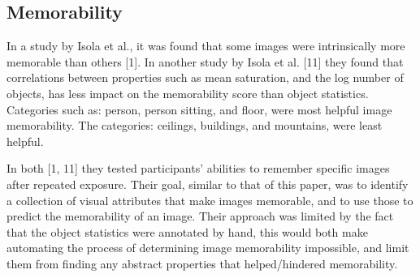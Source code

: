 \documentclass[11pt]{article}
\begin{document}

\subsection{Memorability}



In a study by Isola et al., it was found that some images were intrinsically more memorable than others [1]. In another study by Isola et al. [11] they found that correlations between properties such as mean saturation, and the log number of objects, has less impact on the memorability score than object statistics. Categories such as: person, person sitting, and floor, were most helpful image memorability. The categories: ceilings, buildings, and mountains, were least helpful. 

In both [1, 11] they tested participants' abilities to remember specific images after repeated exposure. Their goal, similar to that of this paper, was to identify a collection of visual attributes that make images memorable, and to use those to predict the memorability of an image. Their approach was limited by the fact that the object statistics were annotated by hand, this would both make automating the process of determining image memorability impossible, and limit them from finding any abstract properties that helped/hindered memorability.
\end{document}
